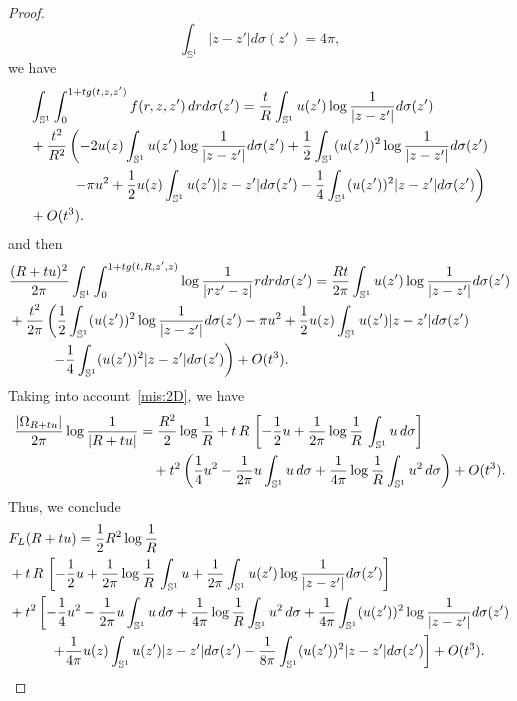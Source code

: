\documentclass[10pt,reqno,english]{amsart}
\newcommand{\be}{\begin{equation}}
\newcommand{\ee}{\end{equation}}
\theoremstyle{definition}
\numberwithin{equation}{section}
\begin{document}
\begin{proof}
\[
\int_{\mathbb{S}^1} |z-z'| d\sigma (z')=4\pi,
\]
we have
\be
\begin{split}
&\int_{\mathbb {S}^1}\int_0^{1+tg(t,z,z')}f(r,z,z')\,drd\sigma(z')=\frac tR \int_{\mathbb{S}^1} u(z') \log {1\over |z-z'|} d\sigma (z')\\
&+\frac{t^2}{R^2}\left(-2u(z)\int_{\mathbb{S}^1} u(z') \log {1\over |z-z'|} d\sigma (z')+\frac12\int_{\mathbb{S}^1} (u(z'))^2 \log {1\over |z-z'|} d\sigma (z')\right.\\
&\left.\qquad\quad-\pi u^2+\frac12u(z)\int_{\mathbb{S}^1} u(z')|z-z'| d\sigma (z')-\frac14\int_{\mathbb{S}^1} (u(z'))^2|z-z'| d\sigma (z')\right)\\
&+O(t^3).
\end{split}
\ee
and then
\begin{align*}
  &  {(R+tu)^2 \over 2\pi} \int_{\mathbb {S}^1} \int_0^{1+ t g(t, R,z',z)} \log {1 \over |r z' - z |} r d r d\sigma (z')=\frac{ Rt}{2\pi}\int_{\mathbb{S}^1} u(z') \log {1\over |z-z'|} d\sigma (z')\\
&+\frac{t^2}{2\pi}\left(\frac12\int_{\mathbb{S}^1} (u(z'))^2 \log {1\over |z-z'|} d\sigma (z')-\pi u^2+\frac12u(z)\int_{\mathbb{S}^1} u(z')|z-z'| d\sigma (z')\right.\\
&\left.\quad\qquad-\frac14\int_{\mathbb{S}^1} (u(z'))^2|z-z'| d\sigma (z')\right)+O(t^3).
\end{align*}
Taking into account~\eqref{mis:2D}, we have
\begin{align*}
    {|\Omega_{R+tu} | \over 2\pi} \log {1\over |R+tu |} &= {R^2 \over 2}   \log {1\over R}+ t  \, R \, \left[ -{1\over 2} u + {1\over 2\pi} \log {1\over R} \, \int_{\mathbb{S}^1} u\,d\sigma \right]\\
    &\quad+t^2\left(\frac{1}{4}u^2-\frac{1}{2\pi} u \int_{\mathbb{S}^1} u\,d\sigma+\frac{1}{4\pi} \log {1\over R}\int_{\mathbb{S}^1} u^2\,d\sigma\right) +O(t^3).
\end{align*}
Thus, we conclude
\begin{align*}
    &F_L (R+tu)= {1 \over 2}  R^2 \log {1\over R}\\
    &+ t  \, R \, \left[ -{1\over 2} u + {1\over 2\pi} \log {1\over R} \, \int_{\mathbb{S}^1} u + {1\over 2\pi}  \int_{\mathbb{S}^1} u(z') \log {1\over |z-z'|} d\sigma (z')\right]\\
    &+t^2\left[-\frac{1}{4}u^2-\frac{1}{2\pi} u \int_{\mathbb{S}^1} u\,d\sigma+\frac{1}{4\pi} \log {1\over R}\int_{\mathbb{S}^1} u^2\,d\sigma+\frac{1}{4\pi}\int_{\mathbb{S}^1} (u(z'))^2 \log {1\over |z-z'|} d\sigma (z')\right.\\
&\left.\qquad\quad+\frac{1}{4\pi}u(z)\int_{\mathbb{S}^1} u(z')|z-z'| d\sigma (z')-\frac{1}{8\pi}\int_{\mathbb{S}^1} (u(z'))^2|z-z'| d\sigma (z')\right]+ O(t^3).\qedhere
\end{align*}
\end{proof}
\end{document}
